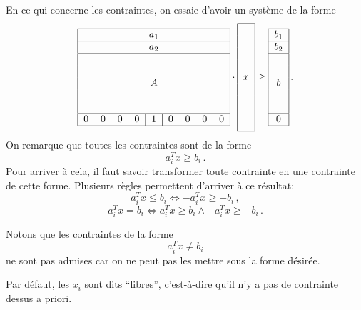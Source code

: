 	En ce qui concerne les contraintes,
	on essaie d'avoir un système de la forme
	\[
	\begin{tabular}{|ccccccccc|}
		\hline
		\multicolumn{9}{|c|}{$a_1$} \\
		\hline
		\multicolumn{9}{|c|}{$a_2$} \\
		\hline
		\multicolumn{9}{|c|}{\multirow{5}{*}{$A$}}
		\\
		&&&&&&&&\\
		&&&&&&&&\\
		&&&&&&&&\\
		&&&&&&&&\\
		\hline
		0 & 0 & 0 & 0 & \multicolumn{1}{|c|}{1} & 0 & 0 & 0 & 0 \\
		\hline
	\end{tabular}
	\cdot
	\begin{tabular}{|c|}
		\hline
		\multirow{9}{*}{$x$}
		\\
		\\
		\\
		\\
		\\
		\\
		\\
		\\
		\\
		\hline
	\end{tabular}
	\ge
	\begin{tabular}{|c|}
		\hline
		$b_1$ \\
		\hline
		$b_2$ \\
		\hline
		\multirow{5}{*}{$b$}
		\\
		\\
		\\
		\\
		\\
		\hline
		0 \\
		\hline
	\end{tabular}\,.
	\]
	On remarque que toutes les contraintes sont de la forme
	\[
	a_i^T x \ge b_i\,.
	\]
	Pour arriver à cela,
	il faut savoir transformer toute contrainte
	en une contrainte de cette forme.
	Plusieurs règles permettent d'arriver à ce résultat:
	\[
	a_i^T x \le b_i \iff -a_i^T x \ge -b_i\,,
	\]
	\[
	a_i^T x = b_i \iff a_i^T x \ge b_i \land -a_i^T x \ge -b_i\,.
	\]

	Notons que les contraintes de la forme
	\[
	a_i^T x \ne b_i
	\]
	ne sont pas admises car on ne peut pas les mettre sous la forme désirée.

	Par défaut, les $x_i$ sont dits ``libres'',
	c'est-à-dire qu'il n'y a pas de contrainte dessus a priori.

